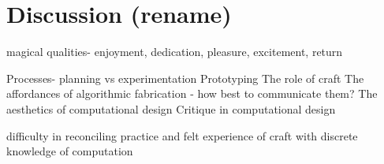 \chapter{Discussion (rename)}

	magical qualities- enjoyment, dedication, pleasure, excitement, return

	Processes- planning vs experimentation
	Prototyping
	The role of craft
	The affordances of algorithmic fabrication - how best to communicate them?
	The aesthetics of computational design
	Critique in computational design
	
	difficulty in reconciling practice and felt experience of craft with discrete knowledge of computation
	
	
